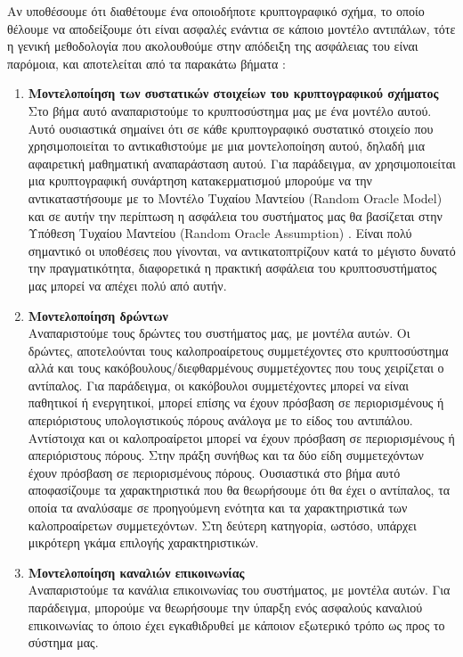 Αν υποθέσουμε ότι διαθέτουμε ένα οποιοδήποτε κρυπτογραφικό σχήμα, το οποίο θέλουμε να αποδείξουμε ότι είναι ασφαλές ενάντια σε κάποιο μοντέλο αντιπάλων, τότε η γενική μεθοδολογία που ακολουθούμε στην απόδειξη της ασφάλειας του είναι παρόμοια, και αποτελείται από τα παρακάτω βήματα :
  
\begin{enumerate}
    \item \textbf{Μοντελοποίηση των συστατικών στοιχείων του κρυπτογραφικού σχήματος}\\
    Στο βήμα αυτό αναπαριστούμε το κρυπτοσύστημα μας με ένα μοντέλο αυτού. Αυτό ουσιαστικά σημαίνει ότι σε κάθε κρυπτογραφικό συστατικό στοιχείο που χρησιμοποιείται το αντικαθιστούμε με μια μοντελοποίηση αυτού, δηλαδή μια αφαιρετική μαθηματική αναπαράσταση αυτού. Για παράδειγμα, αν χρησιμοποιείται μια κρυπτογραφική συνάρτηση κατακερματισμού μπορούμε να την αντικαταστήσουμε με το Μοντέλο Τυχαίου Μαντείου (Random Oracle Model) και σε αυτήν την περίπτωση η ασφάλεια του συστήματος μας θα βασίζεται στην Υπόθεση Τυχαίου Μαντείου (Random Oracle Assumption) \cite{10.1145/168588.168596}. Είναι πολύ σημαντικό οι υποθέσεις που γίνονται, να αντικατοπτρίζουν κατά το μέγιστο δυνατό την πραγματικότητα, διαφορετικά η πρακτική ασφάλεια του κρυπτοσυστήματος μας μπορεί να απέχει πολύ από αυτήν.
    \item \textbf{Μοντελοποίηση δρώντων}\\
    Αναπαριστούμε τους δρώντες του συστήματος μας, με μοντέλα αυτών. Οι δρώντες, αποτελούνται τους καλοπροαίρετους συμμετέχοντες στο κρυπτοσύστημα αλλά και τους κακόβουλους/διεφθαρμένους συμμετέχοντες που τους χειρίζεται ο αντίπαλος. Για παράδειγμα, οι κακόβουλοι συμμετέχοντες μπορεί να είναι παθητικοί ή ενεργητικοί, μπορεί επίσης να έχουν πρόσβαση σε περιορισμένους ή απεριόριστους υπολογιστικούς πόρους ανάλογα με το είδος του αντιπάλου. Αντίστοιχα και οι καλοπροαίρετοι μπορεί να έχουν πρόσβαση σε περιορισμένους ή απεριόριστους πόρους. Στην πράξη συνήθως και τα δύο είδη συμμετεχόντων έχουν πρόσβαση σε περιορισμένους πόρους. Ουσιαστικά στο βήμα αυτό αποφασίζουμε τα χαρακτηριστικά που θα θεωρήσουμε ότι θα έχει ο αντίπαλος, τα οποία τα αναλύσαμε σε προηγούμενη ενότητα και τα χαρακτηριστικά των καλοπροαίρετων συμμετεχόντων. Στη δεύτερη κατηγορία, ωστόσο, υπάρχει μικρότερη γκάμα επιλογής χαρακτηριστικών.
    \item \textbf{Μοντελοποίηση καναλιών επικοινωνίας}\\
    Αναπαριστούμε τα κανάλια επικοινωνίας του συστήματος, με μοντέλα αυτών. Για παράδειγμα, μπορούμε να θεωρήσουμε την ύπαρξη ενός ασφαλούς καναλιού επικοινωνίας το όποιο έχει εγκαθιδρυθεί με κάποιον εξωτερικό τρόπο ως προς το σύστημα μας.

\end{enumerate}

